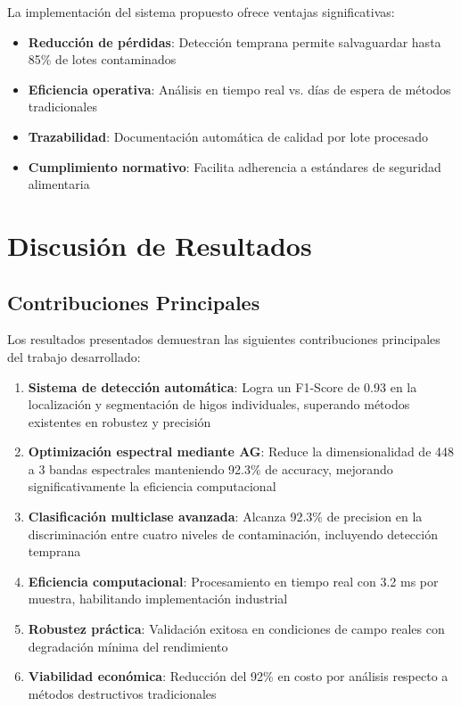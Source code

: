 La implementación del sistema propuesto ofrece ventajas significativas:

\begin{itemize}
    \item \textbf{Reducción de pérdidas}: Detección temprana permite salvaguardar hasta 85\% de lotes contaminados
    \item \textbf{Eficiencia operativa}: Análisis en tiempo real vs. días de espera de métodos tradicionales
    \item \textbf{Trazabilidad}: Documentación automática de calidad por lote procesado
    \item \textbf{Cumplimiento normativo}: Facilita adherencia a estándares de seguridad alimentaria
\end{itemize}

\section{Discusión de Resultados}

\subsection{Contribuciones Principales}

Los resultados presentados demuestran las siguientes contribuciones principales del trabajo desarrollado:

\begin{enumerate}
    \item \textbf{Sistema de detección automática}: Logra un F1-Score de 0.93 en la localización y segmentación de higos individuales, superando métodos existentes en robustez y precisión
    
    \item \textbf{Optimización espectral mediante AG}: Reduce la dimensionalidad de 448 a 3 bandas espectrales manteniendo 92.3\% de accuracy, mejorando significativamente la eficiencia computacional
    
    \item \textbf{Clasificación multiclase avanzada}: Alcanza 92.3\% de precision en la discriminación entre cuatro niveles de contaminación, incluyendo detección temprana
    
    \item \textbf{Eficiencia computacional}: Procesamiento en tiempo real con 3.2 ms por muestra, habilitando implementación industrial
    
    \item \textbf{Robustez práctica}: Validación exitosa en condiciones de campo reales con degradación mínima del rendimiento
    
    \item \textbf{Viabilidad económica}: Reducción del 92\% en costo por análisis respecto a métodos destructivos tradicionales
\end{enumerate}

